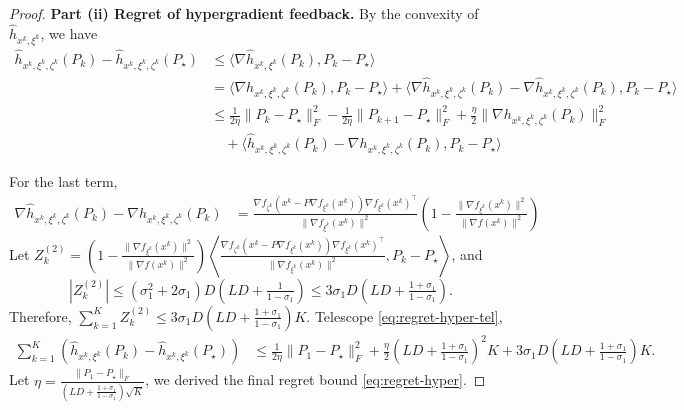 \documentclass{article}
\theoremstyle{definition}
\begin{document}
\begin{proof}
  \textbf{Part (ii) Regret of hypergradient feedback.} By the convexity of $\hat{h}_{x^k, \xi^k}$, we have
  \begin{align}
    \hat{h}_{x^k, \xi^k, \zeta^k} (P_k) - \hat{h}_{x^k, \xi^k, \zeta^k}
    (P_{\star}) &{}\leq \langle \nabla \hat{h}_{x^k, \xi^k} (P_k), P_k - P_{\star}
    \rangle \nonumber\\
    &{}= \langle \nabla h_{x^k, \xi^k, \zeta^k} (P_k), P_k - P_{\star}
    \rangle + \langle \nabla \hat{h}_{x^k, \xi^k, \zeta^k} (P_k) - \nabla
    \hat{h}_{x^k, \xi^k, \zeta^k} (P_k), P_k - P_{\star} \rangle \nonumber\\
    &{}\leq \tfrac{1}{2 \eta} \| P_k - P_{\star} \|_F^2 - \tfrac{1}{2 \eta}
    \| P_{k + 1} - P_{\star} \|_F^2 + \tfrac{\eta}{2} \| \nabla h_{x^k, \xi^k,
    \zeta^k} (P_k) \|_F^2 \nonumber\\
    &{}\quad + \langle \hat{h}_{x^k, \xi^k, \zeta^k} (P_k) - \nabla h_{x^k,
    \xi^k, \zeta^k} (P_k), P_k - P_{\star} \rangle \label{eq:regret-hyper-tel}
  \end{align}

  For the last term,
  \begin{align*}
    \nabla \hat{h}_{x^k, \xi^k, \zeta^k} (P_k) - \nabla h_{x^k, \xi^k,
    \zeta^k} (P_k) &{}= \tfrac{\nabla f_{\zeta^k} (x^k - P \nabla f_{\xi^k}
    (x^k)) \nabla f_{\xi^k} (x^k)^{\top}}{\| \nabla f_{\xi^k} (x^k) \|^2}
    \left( 1 - \tfrac{\| \nabla f_{\xi^k} (x^k) \|^2}{\| \nabla f (x^k) \|^2}
    \right)
  \end{align*}
  Let $Z^{(2)}_k = \left( 1 - \tfrac{\| \nabla f_{\xi^k} (x^k) \|^2}{\| \nabla
  f (x^k) \|^2} \right) \left\langle \tfrac{\nabla f_{\zeta^k} (x^k - P \nabla
  f_{\xi^k} (x^k)) \nabla f_{\xi^k} (x^k)^{\top}}{\| \nabla f_{\xi^k} (x^k)
  \|^2}, P_k - P_{\star} \right\rangle$, and
  \[ | Z^{(2)}_k | \leq (\sigma_1^2 + 2 \sigma_1) D \left( L D + \tfrac{1}{1 -
     \sigma_1} \right) \leq 3 \sigma_1 D \left( L D + \tfrac{1 + \sigma_1}{1 -
     \sigma_1} \right) . \]
  Therefore, $\textstyle \sum_{k = 1}^K Z^{(2)}_k \leq 3 \sigma_1 D \left( L D + \tfrac{1
  + \sigma_1}{1 - \sigma_1} \right) K.$ Telescope \eqref{eq:regret-hyper-tel},
  \begin{align*}
    \textstyle \sum_{k = 1}^K (\hat{h}_{x^k, \xi^k} (P_k) - \hat{h}_{x^k, \xi^k}
    (P_{\star})) &{}\leq \tfrac{1}{2 \eta} \| P_1 - P_{\star} \|_F^2 +
    \tfrac{\eta}{2} \left( L D + \tfrac{1 + \sigma_1}{1 - \sigma_1} \right)^2
    K + 3 \sigma_1 D \left( L D + \tfrac{1 + \sigma_1}{1 - \sigma_1} \right)
    K.
  \end{align*}
  Let $\eta = \frac{\| P_1 - P_{\star} \|_F}{\left( L D + \frac{1 +
  \sigma_1}{1 - \sigma_1} \right) \sqrt{K}}$, we derived the final regret
  bound \eqref{eq:regret-hyper}.
\end{proof}
\end{document}
